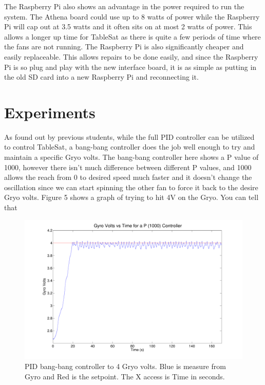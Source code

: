 \documentclass[conference, onecolumn, 12pt]{IEEEtran}
\begin{document}
The Raspberry Pi also shows an advantage in the power required to run the system. The Athena board could use up to 8 watts of power while the Raspberry Pi will cap out at 3.5 watts and it often sits on at most 2 watts of power. This allows a longer up time for TableSat as there is quite a few periods of time where the fans are not running. The Raspberry Pi is also significantly cheaper and easily replaceable. This allows repairs to be done easily, and since the Raspberry Pi is so plug and play with the new interface board, it is as simple as putting in the old SD card into a new Raspberry Pi and reconnecting it.

\section{Experiments}
As found out by previous students, while the full PID controller can be utilized to control TableSat, a bang-bang controller does the job well enough to try and maintain a specific Gryo volts. The bang-bang controller here shows a P value of 1000, however there isn't much difference between different P values, and 1000 allows the reach from 0 to desired speed much faster and it doesn't change the oscillation since we can start spinning the other fan to force it back to the desire Gryo volts. Figure 5 shows a graph of trying to hit 4V on the Gryo. You can tell that 

\begin{figure}
\centering
\includegraphics[width=\linewidth]{bang-bang.pdf}
\caption{PID bang-bang controller to 4 Gryo volts. Blue is measure from Gyro and Red is the setpoint. The X access is Time in seconds.}
\end{figure}
\end{document}
